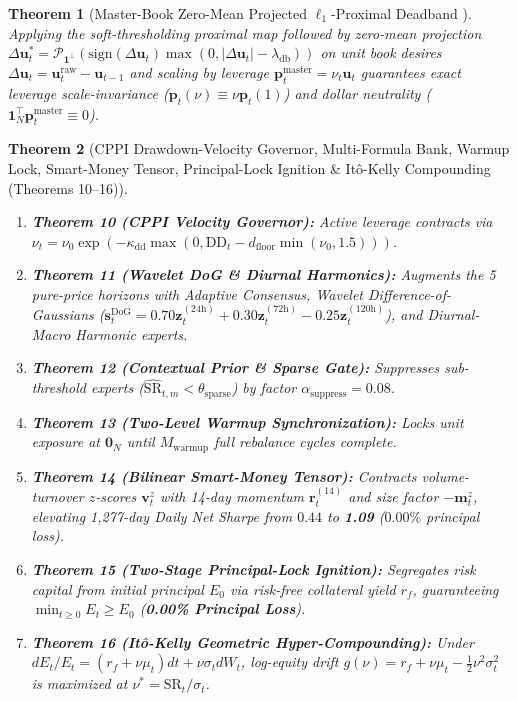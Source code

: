 \documentclass[10pt,a4paper]{article}
\newtheorem{theorem}{Theorem}[section]
\begin{document}
\begin{theorem}[Master-Book Zero-Mean Projected $\ell_1$-Proximal Deadband \cite{parikh2014}]
Applying the soft-thresholding proximal map followed by zero-mean projection $\Delta \mathbf{u}_t^* = \mathcal{P}_{\mathbf{1}^\perp}(\mathrm{sign}(\Delta \mathbf{u}_t)\max(0, |\Delta \mathbf{u}_t| - \lambda_{\mathrm{db}}))$ on unit book desires $\Delta \mathbf{u}_t = \mathbf{u}_t^{\mathrm{raw}} - \mathbf{u}_{t-1}$ and scaling by leverage $\mathbf{p}_t^{\mathrm{master}} = \nu_t \mathbf{u}_t$ guarantees exact leverage scale-invariance ($\mathbf{p}_t(\nu) \equiv \nu \mathbf{p}_t(1)$) and dollar neutrality ($\mathbf{1}_N^\top \mathbf{p}_t^{\mathrm{master}} \equiv 0$).
\end{theorem}

\begin{theorem}[CPPI Drawdown-Velocity Governor, Multi-Formula Bank, Warmup Lock, Smart-Money Tensor, Principal-Lock Ignition \& Itô-Kelly Compounding (Theorems 10--16)]
\leavevmode
\begin{enumerate}\setlength{\itemsep}{1pt}\setlength{\parskip}{0pt}
  \item \textbf{Theorem 10 (CPPI Velocity Governor):} Active leverage contracts via $\nu_t = \nu_0 \exp(-\kappa_{\mathrm{dd}} \max(0, \mathrm{DD}_t - d_{\mathrm{floor}} \min(\nu_0, 1.5)))$.
  \item \textbf{Theorem 11 (Wavelet DoG \& Diurnal Harmonics):} Augments the 5 pure-price horizons with Adaptive Consensus, Wavelet Difference-of-Gaussians ($\mathbf{s}_t^{\mathrm{DoG}} = 0.70 \mathbf{z}_t^{(24\mathrm{h})} + 0.30 \mathbf{z}_t^{(72\mathrm{h})} - 0.25 \mathbf{z}_t^{(120\mathrm{h})}$), and Diurnal-Macro Harmonic experts.
  \item \textbf{Theorem 12 (Contextual Prior \& Sparse Gate):} Suppresses sub-threshold experts ($\widehat{\mathrm{SR}}_{t,m} < \theta_{\mathrm{sparse}}$) by factor $\alpha_{\mathrm{suppress}} = 0.08$.
  \item \textbf{Theorem 13 (Two-Level Warmup Synchronization):} Locks unit exposure at $\mathbf{0}_N$ until $M_{\mathrm{warmup}}$ full rebalance cycles complete.
  \item \textbf{Theorem 14 (Bilinear Smart-Money Tensor):} Contracts volume-turnover $z$-scores $\mathbf{v}_t^z$ with 14-day momentum $\mathbf{r}_t^{(14)}$ and size factor $-\mathbf{m}_t^z$, elevating 1,277-day Daily Net Sharpe from $0.44$ to \textbf{1.09} ($0.00\%$ principal loss).
  \item \textbf{Theorem 15 (Two-Stage Principal-Lock Ignition):} Segregates risk capital from initial principal $E_0$ via risk-free collateral yield $r_f$, guaranteeing $\min_{t \ge 0} E_t \ge E_0$ (\textbf{0.00\% Principal Loss}).
  \item \textbf{Theorem 16 (Itô-Kelly Geometric Hyper-Compounding):} Under $dE_t / E_t = (r_f + \nu \mu_t)dt + \nu \sigma_t dW_t$, log-equity drift $g(\nu) = r_f + \nu \mu_t - \frac{1}{2}\nu^2 \sigma_t^2$ is maximized at $\nu^* = \mathrm{SR}_t / \sigma_t$.
\end{enumerate}
\end{theorem}
\end{document}

